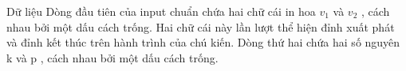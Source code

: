 Dữ liệu  
Dòng đầu tiên của input chuẩn chứa hai chữ cái in hoa       $v_{1}$      và       $v_{2}$      , cách nhau bởi một dấu cách trống. Hai chữ cái này lần lượt thể hiện đỉnh xuất phát và đỉnh kết thúc trên hành trình của chú kiến. Dòng thứ hai chứa hai số nguyên       k      và       p      , cách nhau bởi một dấu cách trống.